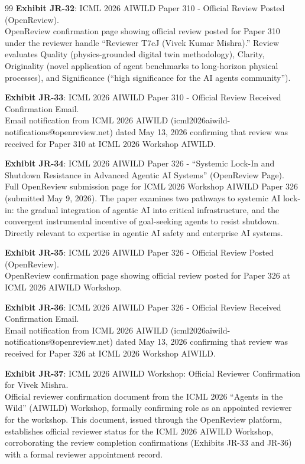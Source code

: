 \documentclass[11pt]{article}
\begin{document}
\begin{thebibliography}{99}
\textbf{Exhibit JR-32}: ICML 2026 AIWILD Paper 310 - Official Review Posted (OpenReview).
\\OpenReview confirmation page showing \drs official review posted for Paper 310 under the reviewer handle ``Reviewer T7cJ (Vivek Kumar Mishra).'' Review evaluates Quality (physics-grounded digital twin methodology), Clarity, Originality (novel application of agent benchmarks to long-horizon physical processes), and Significance (``high significance for the AI agents community'').

\textbf{Exhibit JR-33}: ICML 2026 AIWILD Paper 310 - Official Review Received Confirmation Email.
\\Email notification from ICML 2026 AIWILD (icml2026aiwild-notifications@openreview.net) dated May 13, 2026 confirming that \drs review was received for Paper 310 at ICML 2026 Workshop AIWILD.

\textbf{Exhibit JR-34}: ICML 2026 AIWILD Paper 326 - ``Systemic Lock-In and Shutdown Resistance in Advanced Agentic AI Systems'' (OpenReview Page).
\\Full OpenReview submission page for ICML 2026 Workshop AIWILD Paper 326 (submitted May 9, 2026). The paper examines two pathways to systemic AI lock-in: the gradual integration of agentic AI into critical infrastructure, and the convergent instrumental incentive of goal-seeking agents to resist shutdown. Directly relevant to \drs expertise in agentic AI safety and enterprise AI systems.

\textbf{Exhibit JR-35}: ICML 2026 AIWILD Paper 326 - Official Review Posted (OpenReview).
\\OpenReview confirmation page showing \drs official review posted for Paper 326 at ICML 2026 AIWILD Workshop.

\textbf{Exhibit JR-36}: ICML 2026 AIWILD Paper 326 - Official Review Received Confirmation Email.
\\Email notification from ICML 2026 AIWILD (icml2026aiwild-notifications@openreview.net) dated May 13, 2026 confirming that \drs review was received for Paper 326 at ICML 2026 Workshop AIWILD.

\textbf{Exhibit JR-37}: ICML 2026 AIWILD Workshop: Official Reviewer Confirmation for Vivek Mishra.
\\Official reviewer confirmation document from the ICML 2026 ``Agents in the Wild'' (AIWILD) Workshop, formally confirming \drs role as an appointed reviewer for the workshop. This document, issued through the OpenReview platform, establishes \drs official reviewer status for the ICML 2026 AIWILD Workshop, corroborating the review completion confirmations (Exhibits JR-33 and JR-36) with a formal reviewer appointment record.


\end{thebibliography}
\end{document}
